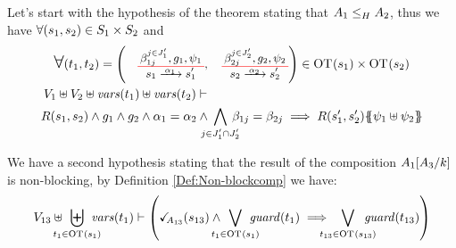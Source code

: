 \documentclass[runningheads]{llncs}
\begin{document}
\begin{enumerate}
Let's start  with the hypothesis of the theorem stating that $\wrel{A_1}{A_2}{H}$, thus we have   $\forall \mpar{s_1,s_{2}} \in S_1 \times S_2$ and
\begin{multline*}
\bigsymb{\forall} \mpar{t_1, t_{2}} = \mpar{\OTx{1}{}{1}{1}, \OTx{2}{}{2}{2}} \in \fOT{s_1} \times \fOT{s_2} \\  V_1 \uplus V_2 \uplus \fvars{t_1} \uplus \fvars{t_2} \vdash \hspace{6cm}\\  R\mpar{s_1, s_2} \wedge 	g_1 \wedge g_{2} \wedge \alpha_1 = \alpha_{2} \wedge \bigwedge_\subbox{j \in J'_1 \cap J'_{2}} \beta_{1j} = \beta_{2j} \implies  R\mpar{s'_1, s'_{2}}\psubst{\psi_1 \uplus \psi_2}
\end{multline*}

We have a second hypothesis stating that the result of the composition \(A_1\subst{A_3}{k}\) is non-blocking, by Definition \ref{Def:Non-blockcomp} we have:
\begin{multline*}
V_{13}  \uplus \biguplus_\subbox{t_1 \in \fOT{s_1}} \fvars{t_1} \vdash \left( \reach{A_{13}}\mpar{s_{13}} \wedge \bigvee_\subbox{t_1 \in \fOT{s_1}} \fguard{t_1} \implies \bigvee_\subbox{t_{13} \in \fOT{s_{13}}} \fguard{t_{13}} \right)
\end{multline*}


\end{enumerate}
\end{document}
